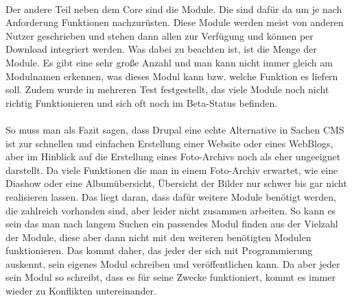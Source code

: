 \\
Der andere Teil neben dem Core sind die Module. Die sind dafür da um je nach Anforderung Funktionen nachzurüsten. Diese Module werden meist von anderen Nutzer geschrieben und stehen dann allen zur Verfügung und können per Download integriert werden.
Was dabei zu beachten ist, ist die Menge der Module. Es gibt eine sehr große Anzahl und man kann nicht immer gleich am Modulnamen erkennen, was dieses Modul kann bzw. welche Funktion es liefern soll. Zudem wurde in mehreren Test festgestellt, das viele Module noch nicht richtig Funktionieren und sich oft noch im Beta-Status befinden.\\
\\
So muss man als Fazit sagen, dass Drupal eine echte Alternative in Sachen CMS ist zur schnellen und einfachen Erstellung einer Website oder eines WebBlogs, aber im Hinblick auf die Erstellung eines Foto-Archivs noch als eher ungeeignet darstellt. Da viele Funktionen die man in einem Foto-Archiv erwartet, wie eine Diashow oder eine Albumübersicht, Übersicht der Bilder nur schwer bis gar nicht realisieren lassen. Das liegt daran, dass dafür weitere Module benötigt werden, die zahlreich vorhanden sind, aber leider nicht zusammen arbeiten. So kann es sein das man nach langem Suchen ein passendes Modul finden aus der Vielzahl der Module, diese aber dann nicht mit den weiteren benötigten Modulen funktionieren. Das kommt daher, das jeder der sich mit Programmierung auskennt, sein eigenes Modul schreiben und veröffentlichen kann. Da aber jeder sein Modul so schreibt, dass es für seine Zwecke funktioniert, kommt es immer wieder zu Konflikten untereinander.
